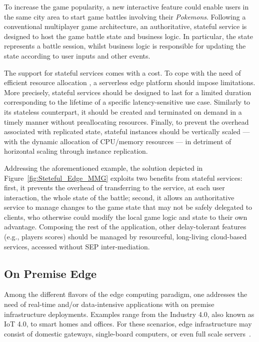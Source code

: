 To increase the game popularity, a new interactive feature could enable users in the same city area to start game battles involving their \textit{Pokemons}. Following a conventional multiplayer game architecture, an authoritative, stateful service is designed to host the game battle state and business logic. In particular, the state represents a battle session, whilst business logic is responsible for updating the state according to user inputs and other events. 

The support for stateful services comes with a cost. To %
cope with the need of efficient resource allocation
, a serverless edge platform should impose limitations. More precisely, stateful services should be designed to last for a limited duration corresponding to the lifetime of a specific latency-sensitive use case. Similarly to its stateless counterpart, it should be created and terminated on demand in a timely manner without preallocating resources. Finally, to prevent the overhead associated with replicated state, stateful instances should be vertically scaled --- with the dynamic allocation of CPU/memory resources --- in detriment of horizontal scaling through instance replication.

Addressing the aforementioned example, the solution depicted in Figure~\ref{fig:Steteful_Edge_MMG} exploits two benefits from stateful services: first, it prevents the overhead of transferring to the service, at each user interaction, the whole state of the battle; second, it allows an authoritative service to manage changes to the game state that may not be safely delegated to clients, who otherwise could modify the local game logic and state to their own advantage.
Composing the rest of the application, other delay-tolerant features (e.g., players scores) should be managed by resourceful, long-living cloud-based services, accessed without SEP inter-mediation.  %

\subsection{On Premise Edge}

Among the 
different flavors of the edge computing paradigm, one addresses the need of real-time and/or data-intensive applications with on premise infrastructure deployments. Examples range from the Industry 4.0, also known as IoT 4.0, to
smart homes and offices. For these scenarios, edge infrastructure may consist of domestic gateways, single-board computers, or even full scale servers~\cite{}.

